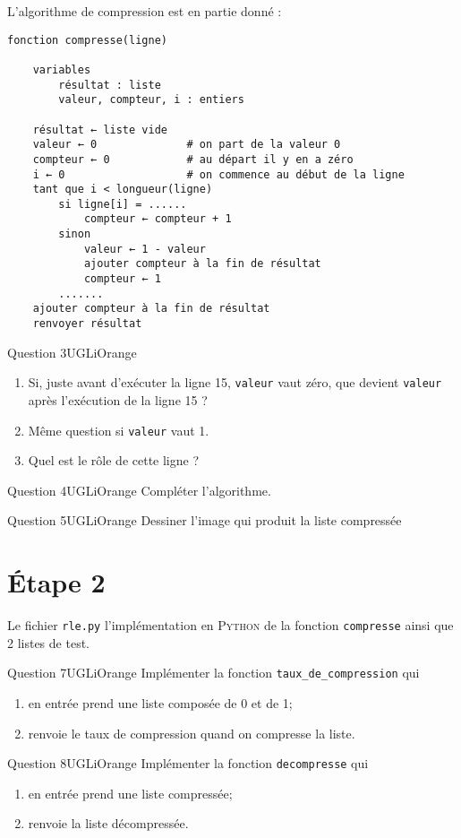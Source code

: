 L'algorithme de compression est en partie donné :


\begin{pseudocode}\begin{verbatim}
fonction compresse(ligne)

    variables
        résultat : liste
        valeur, compteur, i : entiers
        
    résultat ← liste vide
    valeur ← 0              # on part de la valeur 0
    compteur ← 0            # au départ il y en a zéro
    i ← 0                   # on commence au début de la ligne
    tant que i < longueur(ligne)
        si ligne[i] = ......
            compteur ← compteur + 1
        sinon
            valeur ← 1 - valeur
            ajouter compteur à la fin de résultat
            compteur ← 1
        .......
    ajouter compteur à la fin de résultat
    renvoyer résultat
\end{verbatim}
\end{pseudocode}

\begin{encadrecolore}{Question 3}{UGLiOrange}
\begin{enumerate}[\bfseries a.]
	\item Si, juste avant d'exécuter la ligne 15, \texttt{valeur} vaut zéro, que devient \texttt{valeur} après l'exécution de la ligne 15 ?
    \item Même question si \texttt{valeur} vaut 1.
    \item Quel est le rôle de cette ligne ?
\end{enumerate}
\end{encadrecolore}


\begin{encadrecolore}{Question 4}{UGLiOrange}
Compléter l'algorithme.
\end{encadrecolore}


\begin{encadrecolore}{Question 5}{UGLiOrange}
Dessiner l'image qui produit la liste compressée
\end{encadrecolore}


\section*{\'Etape 2}

Le fichier \texttt{rle.py} l'implémentation en \textsc{Python} de la fonction \texttt{compresse} ainsi que 2 listes de test.


\begin{encadrecolore}{Question 7}{UGLiOrange}
Implémenter la fonction \texttt{taux\_de\_compression} qui
\begin{enumerate}[--]
	\item en entrée prend une liste composée de 0 et de 1;
    \item renvoie le taux de compression quand on compresse la liste.
\end{enumerate}
\end{encadrecolore}


\begin{encadrecolore}{Question 8}{UGLiOrange}
Implémenter la fonction \texttt{decompresse} qui
\begin{enumerate}[--]
	\item en entrée prend une liste compressée;
    \item renvoie la liste décompressée.
\end{enumerate}
\end{encadrecolore}

